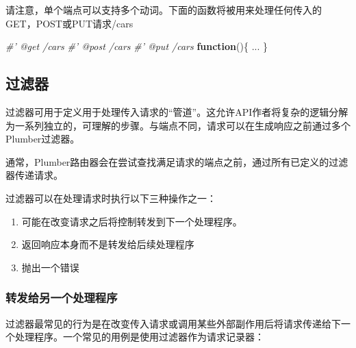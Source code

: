 \documentclass[]{book}
\newenvironment{Shaded}{\begin{snugshade}}{\end{snugshade}}
\newcommand{\KeywordTok}[1]{\textcolor[rgb]{0.13,0.29,0.53}{\textbf{#1}}}
\newcommand{\CharTok}[1]{\textcolor[rgb]{0.31,0.60,0.02}{#1}}
\newcommand{\StringTok}[1]{\textcolor[rgb]{0.31,0.60,0.02}{#1}}
\newcommand{\CommentTok}[1]{\textcolor[rgb]{0.56,0.35,0.01}{\textit{#1}}}
\newcommand{\ControlFlowTok}[1]{\textcolor[rgb]{0.13,0.29,0.53}{\textbf{#1}}}
\newcommand{\OperatorTok}[1]{\textcolor[rgb]{0.81,0.36,0.00}{\textbf{#1}}}
\newcommand{\NormalTok}[1]{#1}
\begin{document}
请注意，单个端点可以支持多个动词。下面的函数将被用来处理任何传入的GET，POST或PUT请求/cars

\begin{Shaded}
\begin{Highlighting}[]
\CommentTok{#' @get /cars}
\CommentTok{#' @post /cars}
\CommentTok{#' @put /cars}
\ControlFlowTok{function}\NormalTok{()\{}
\NormalTok{  ...}
\NormalTok{\}}
\end{Highlighting}
\end{Shaded}

\subsection{过滤器}

过滤器可用于定义用于处理传入请求的``管道''。这允许API作者将复杂的逻辑分解为一系列独立的，可理解的步骤。与端点不同，请求可以在生成响应之前通过多个Plumber过滤器。

通常，Plumber路由器会在尝试查找满足请求的端点之前，通过所有已定义的过滤器传递请求。

过滤器可以在处理请求时执行以下三种操作之一：

\begin{enumerate}
\def\labelenumi{\arabic{enumi}.}
\item
  可能在改变请求之后将控制转发到下一个处理程序。
\item
  返回响应本身而不是转发给后续处理程序
\item
  抛出一个错误
\end{enumerate}

\subsubsection{转发给另一个处理程序}

过滤器最常见的行为是在改变传入请求或调用某些外部副作用后将请求传递给下一个处理程序。一个常见的用例是使用过滤器作为请求记录器：

\begin{Shaded}
\end{Shaded}
\end{document}
